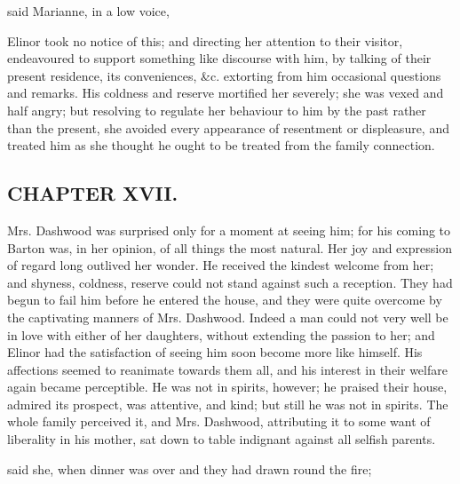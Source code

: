  said Marianne, in a low voice, 

Elinor took no notice of this; and directing her attention to their visitor, endeavoured to support something like discourse with him, by talking of their present residence, its conveniences, &c. extorting from him occasional questions and remarks. His coldness and reserve mortified her severely; she was vexed and half angry; but resolving to regulate her behaviour to him by the past rather than the present, she avoided every appearance of resentment or displeasure, and treated him as she thought he ought to be treated from the family connection.

\subsection[chapter-xvii.]{\useURL[url17][][][]\from[url17]CHAPTER XVII.}

Mrs. Dashwood was surprised only for a moment at seeing him; for his coming to Barton was, in her opinion, of all things the most natural. Her joy and expression of regard long outlived her wonder. He received the kindest welcome from her; and shyness, coldness, reserve could not stand against such a reception. They had begun to fail him before he entered the house, and they were quite overcome by the captivating manners of Mrs. Dashwood. Indeed a man could not very well be in love with either of her daughters, without extending the passion to her; and Elinor had the satisfaction of seeing him soon become more like himself. His affections seemed to reanimate towards them all, and his interest in their welfare again became perceptible. He was not in spirits, however; he praised their house, admired its prospect, was attentive, and kind; but still he was not in spirits. The whole family perceived it, and Mrs. Dashwood, attributing it to some want of liberality in his mother, sat down to table indignant against all selfish parents.

 said she, when dinner was over and they had drawn round the fire; 



